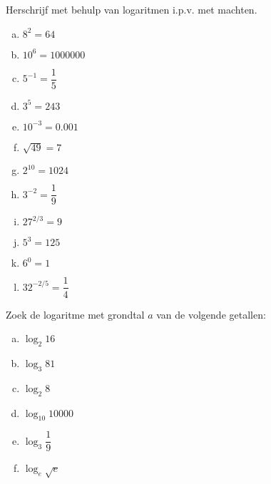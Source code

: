 \documentclass[12pt,twoside]{article}
\begin{document}
\begin{oefening} %
Herschrijf met behulp van logaritmen i.p.v. met machten.
\begin{multicols}{4}
\begin{enumerate}[(a)]
  \item $8^2=64$
  \item $10^6=1000000$
  \item $5^{-1}=\dfrac{1}{5}$
  \item $3^5=243$
  \item $10^{-3}=0.001$
  \item $\sqrt{49}=7$
  \item $2^{10}=1024$
  \item $3^{-2}=\dfrac{1}{9}$
  \item $27^{2/3}=9$
  \item $5^3=125$
  \item $6^0=1$
  \item $32^{-2/5}=\dfrac{1}{4}$
\end{enumerate}
\end{multicols}
\end{oefening}

\begin{oefening}
Zoek de logaritme met grondtal $a$ van de volgende getallen:
\begin{multicols}{2}
\begin{enumerate}[(a)]
  \itemsep0.7em
  \item $\log_2 16$
  \item $\log_3 81$
  \item $\log_2 8$
  \item $\log_{10} 10000$
  \item $\log_3 \dfrac{1}{9}$
  \item $\log_e \sqrt{e}$
\end{enumerate}
\end{multicols}
\end{oefening}


\pagebreak
\end{document}
